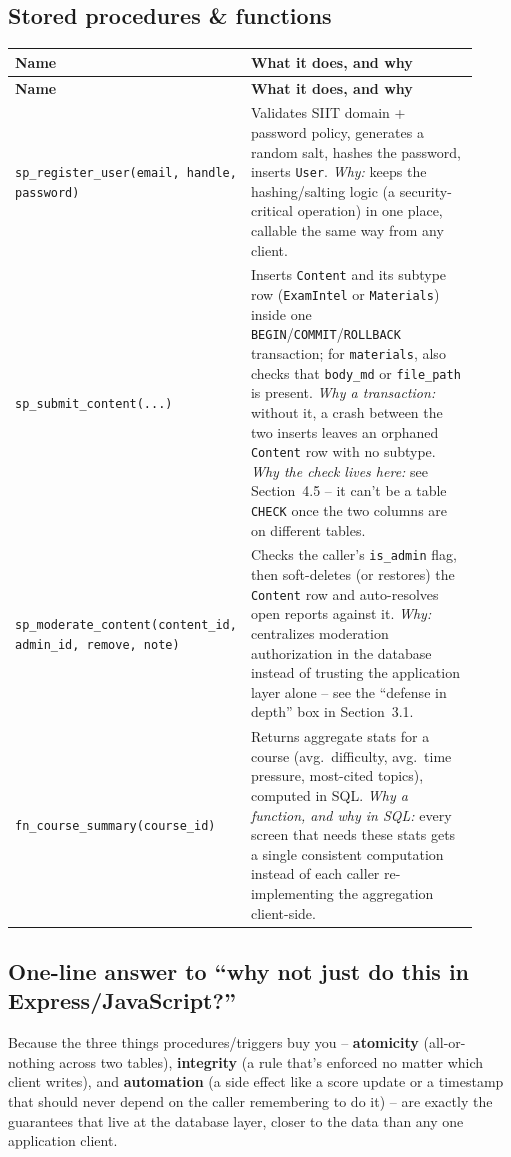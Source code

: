 \documentclass[11pt]{article}
\begin{document}
\subsection{Stored procedures \& functions}
\begin{longtable}{@{}p{0.30\linewidth} p{0.62\linewidth}@{}}
\toprule
\textbf{Name} & \textbf{What it does, and why} \\
\midrule
\endfirsthead
\toprule
\textbf{Name} & \textbf{What it does, and why} \\
\midrule
\endhead
\bottomrule
\endfoot
\texttt{sp\_register\_user(\allowbreak email, handle, password)} & Validates SIIT domain + password policy, generates a random salt, hashes the password, inserts \texttt{User}. \emph{Why:} keeps the hashing/salting logic (a security-critical operation) in one place, callable the same way from any client. \\[4pt]
\texttt{sp\_submit\_content(...)} & Inserts \texttt{Content} and its subtype row (\texttt{ExamIntel} or \texttt{Materials}) inside one \texttt{BEGIN}/\texttt{COMMIT}/\texttt{ROLLBACK} transaction; for \texttt{materials}, also checks that \texttt{body\_md} or \texttt{file\_path} is present. \emph{Why a transaction:} without it, a crash between the two inserts leaves an orphaned \texttt{Content} row with no subtype. \emph{Why the check lives here:} see Section~4.5 -- it can't be a table \texttt{CHECK} once the two columns are on different tables. \\[4pt]
\texttt{sp\_moderate\_\allowbreak content(\allowbreak content\_id, admin\_id, remove, note)} & Checks the caller's \texttt{is\_admin} flag, then soft-deletes (or restores) the \texttt{Content} row and auto-resolves open reports against it. \emph{Why:} centralizes moderation authorization in the database instead of trusting the application layer alone -- see the ``defense in depth'' box in Section~3.1. \\[4pt]
\texttt{fn\_course\_\allowbreak summary(\allowbreak course\_id)} & Returns aggregate stats for a course (avg.\ difficulty, avg.\ time pressure, most-cited topics), computed in SQL. \emph{Why a function, and why in SQL:} every screen that needs these stats gets a single consistent computation instead of each caller re-implementing the aggregation client-side. \\
\end{longtable}

\subsection{One-line answer to ``why not just do this in Express/JavaScript?''}
Because the three things procedures/triggers buy you -- \textbf{atomicity} (all-or-nothing across two tables), \textbf{integrity} (a rule that's enforced no matter which client writes), and \textbf{automation} (a side effect like a score update or a timestamp that should never depend on the caller remembering to do it) -- are exactly the guarantees that live at the database layer, closer to the data than any one application client.
\end{document}
